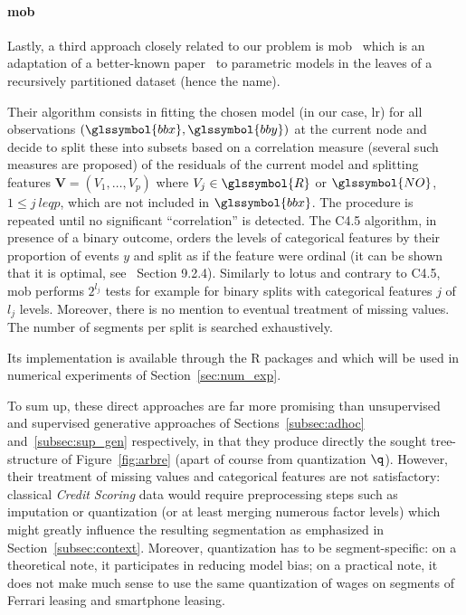 \paragraph{\gls{mob}} \label{par:mob}

Lastly, a third approach closely related to our problem is \gls{mob}~\cite{zeileis2008model} which is an adaptation of a better-known paper~\cite{hothorn2006unbiased} to parametric models in the leaves of a recursively partitioned dataset (hence the name).

Their algorithm consists in fitting the chosen model (in our case, \gls{lr}) for all observations $(\glssymbol{bbx},\glssymbol{bby})$ at the current node and decide to split these into subsets based on a correlation measure (several such measures are proposed) of the residuals of the current model and splitting features $\bm{V} = (V_1, \dots, V_p)$ where $V_j \in \glssymbol{R}$ or $\glssymbol{NO}$, $1 \leq j \ leq p$, which are not included in $\glssymbol{bbx}$. The procedure is repeated until no significant ``correlation'' is detected. The C4.5 algorithm, in presence of a binary outcome, orders the levels of categorical features by their proportion of events $y$ and split as if the feature were ordinal (it can be shown that it is optimal, see~\cite{friedman2001elements} Section 9.2.4).  Similarly to \gls{lotus} and contrary to C4.5, \gls{mob} performs $2^{l_j}$ tests for example for binary splits with categorical features $j$ of $l_j$ levels. Moreover, there is no mention to eventual treatment of missing values. The number of segments per split is searched exhaustively.

Its implementation is available through the \textsf{R} packages  and  which will be used in numerical experiments of Section~\ref{sec:num_exp}.

To sum up, these direct approaches are far more promising than unsupervised and supervised generative approaches of Sections~\ref{subsec:adhoc} and~\ref{subsec:sup_gen} respectively, in that they produce directly the sought tree-structure of Figure~\ref{fig:arbre} (apart of course from quantization $\q$). However, their treatment of missing values and categorical features are not satisfactory: classical \textit{Credit Scoring} data would require preprocessing steps such as imputation or quantization (or at least merging numerous factor levels) which might greatly influence the resulting segmentation as emphasized in Section~\ref{subsec:context}. Moreover, quantization has to be segment-specific: on a theoretical note, it participates in reducing model bias; on a practical note, it does not make much sense to use the same quantization of wages on segments of Ferrari leasing and smartphone leasing.

